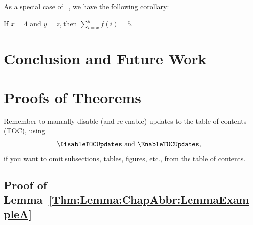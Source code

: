 As a special case of \Theorem~, we have the following corollary:

\begin{Thm:Corollary}
If \mbox{$x=4$} and \mbox{$y=z$}, then \mbox{$\sum_{i=x}^{y} f(i) = 5$}.
\end{Thm:Corollary}

\lipsum[13]


\section{Conclusion and Future Work}
\label{Section:ChapAbbr:Conclusion}

\lipsum[14-15]


\section{Proofs of Theorems}
\label{Section:ChapAbbr:ProofsOfTheorems}

\noindent
{\color{red}%
Remember to manually disable (and re-enable) updates to the table of contents (TOC), using
\[
\verb|\DisableTOCUpdates|
\text{ and }
\verb|\EnableTOCUpdates|,
\]
if you want to omit subsections, tables, figures, etc., from the table of contents.}


\DisableTOCUpdates


\subsection{Proof of Lemma~\ref{Thm:Lemma:ChapAbbr:LemmaExampleA}}

\lipsum[16-17]
\qedmarker


